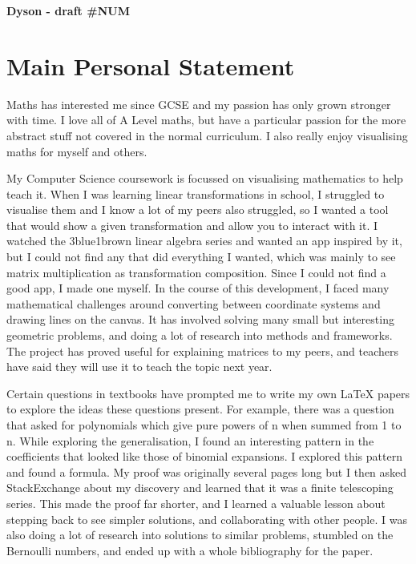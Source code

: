 \documentclass[a4paper, 12pt]{article}
\newenvironment{personalstatement}{\directlua{startPersonalStatement()}}{\directlua{stopPersonalStatement()}}
\begin{document}
\begin{center}
	\vspace*{3mm}
	\huge{\textbf{Dyson - draft \#NUM}}
\end{center}

\setlength{\parskip}{7.5ex}
\setlength{\parindent}{0em}

\vspace*{-12ex} %
\section*{Main Personal Statement}
\vspace*{-6ex}

\begin{personalstatement}
Maths has interested me since GCSE and my passion has only grown stronger with time. I love all of A Level maths, but have a particular passion for the more abstract stuff not covered in the normal curriculum. I also really enjoy visualising maths for myself and others.

My Computer Science coursework is focussed on visualising mathematics to help teach it. When I was learning linear transformations in school, I struggled to visualise them and I know a lot of my peers also struggled, so I wanted a tool that would show a given transformation and allow you to interact with it. I watched the 3blue1brown linear algebra series and wanted an app inspired by it, but I could not find any that did everything I wanted, which was mainly to see matrix multiplication as transformation composition. Since I could not find a good app, I made one myself. In the course of this development, I faced many mathematical challenges around converting between coordinate systems and drawing lines on the canvas. It has involved solving many small but interesting geometric problems, and doing a lot of research into methods and frameworks. The project has proved useful for explaining matrices to my peers, and teachers have said they will use it to teach the topic next year.

Certain questions in textbooks have prompted me to write my own LaTeX papers to explore the ideas these questions present. For example, there was a question that asked for polynomials which give pure powers of n when summed from 1 to n. While exploring the generalisation, I found an interesting pattern in the coefficients that looked like those of binomial expansions. I explored this pattern and found a formula. My proof was originally several pages long but I then asked StackExchange about my discovery and learned that it was a finite telescoping series. This made the proof far shorter, and I learned a valuable lesson about stepping back to see simpler solutions, and collaborating with other people. I was also doing a lot of research into solutions to similar problems, stumbled on the Bernoulli numbers, and ended up with a whole bibliography for the paper.


\end{personalstatement}
\end{document}
